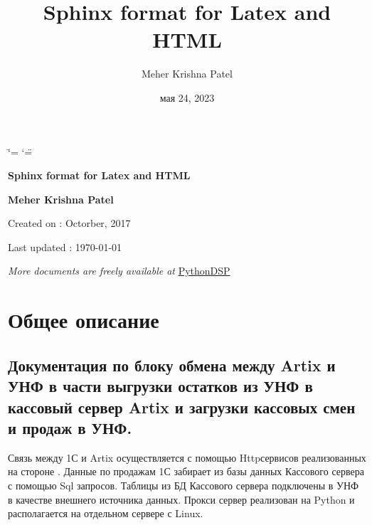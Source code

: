 \documentclass[a4paper,10pt,russian]{report}
\title{Sphinx format for Latex and HTML}
\date{мая 24, 2023}
\author{Meher Krishna Patel}
\begin{document}
\ifdefined\shorthandoff
  \ifnum\catcode`\=\string=\active\shorthandoff{=}\fi
  \ifnum\catcode`\"=\active{}\fi
\fi

\pagestyle{empty}


        \begin{titlepage}
            \centering

            \vspace*{40mm} %
            \textbf{\Huge {Sphinx format for Latex and HTML}}

            \vspace{0mm}

            \vspace{0mm}
            \Large \textbf{{Meher Krishna Patel}}

            \small Created on : Octorber, 2017

            \vspace*{0mm}
            \small  Last updated : \MonthYearFormat\today


            \vfill
            \small \textit{More documents are freely available at }{\href{http://pythondsp.readthedocs.io/en/latest/pythondsp/toc.html}{PythonDSP}}
        \end{titlepage}

        \clearpage
        \tableofcontents
        \listoffigures
        \listoftables
        \clearpage

        
\pagestyle{plain}
 
\pagestyle{normal}
\label{\detokenize{index::doc}}


\sphinxstepscope


\chapter{Общее описание}
\label{\detokenize{description:id1}}\label{\detokenize{description::doc}}

\section{Документация по блоку обмена между Artix и УНФ в части выгрузки остатков из УНФ в кассовый сервер Artix и загрузки кассовых смен и продаж в УНФ.}
\label{\detokenize{description:artix-artix}}
\sphinxAtStartPar
Связь между 1С и Artix осуществляется с помощью Http\sphinxhyphen{}сервисов реализованных на стороне . Данные по продажам 1С забирает из базы данных
Кассового сервера с помощью Sql запросов. Таблицы из БД Кассового сервера подключены в УНФ в качестве внешнего источника данных.
Прокси сервер реализован на Python и располагается на отдельном сервере с Linux.
\end{document}

